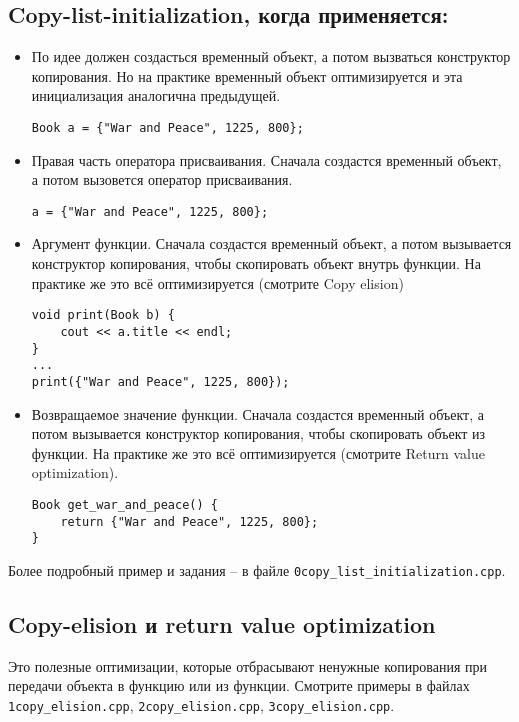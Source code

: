 \documentclass{article}
\begin{document}
\subsection*{Copy-list-initialization, когда применяется:}
\begin{itemize}
\item По идее должен создасться временный объект, а потом вызваться конструктор копирования. Но на практике временный объект оптимизируется и эта инициализация аналогична предыдущей.
\begin{lstlisting}
Book a = {"War and Peace", 1225, 800};
\end{lstlisting}

\item Правая часть оператора присваивания. Сначала создастся временный объект, а потом вызовется оператор присваивания.
\begin{lstlisting}
a = {"War and Peace", 1225, 800};
\end{lstlisting}

\item Аргумент функции. Сначала создастся временный объект, а потом вызывается конструктор копирования, чтобы скопировать объект внутрь функции. На практике же это всё оптимизируется (смотрите Copy elision)
\begin{lstlisting}
void print(Book b) {
    cout << a.title << endl;
}
...
print({"War and Peace", 1225, 800});
\end{lstlisting}

\item Возвращаемое значение функции. Сначала создастся временный объект, а потом вызывается конструктор копирования, чтобы скопировать объект из функции. На практике же это всё оптимизируется (смотрите Return value optimization).
\begin{lstlisting}
Book get_war_and_peace() {
    return {"War and Peace", 1225, 800};
}
\end{lstlisting}
\end{itemize}
Более подробный пример и задания -- в файле \texttt{0copy\_list\_initialization.cpp}.
\subsection*{Copy-elision и return value optimization}
Это полезные оптимизации, которые отбрасывают ненужные копирования при передачи объекта в функцию или из функции. 
Смотрите примеры в файлах \texttt{1copy\_elision.cpp}, \texttt{2copy\_elision.cpp}, \texttt{3copy\_elision.cpp}.
\end{document}
